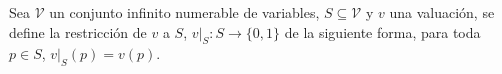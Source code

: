 %
%

\begin{definition}
Sea $\mathcal{V}$ un conjunto infinito numerable de variables, $S \subseteq \mathcal{V}$ y $v$ una valuación, se define la restricción de $v$ a $S$, $v|_S:S \to \{0, 1\}$ de la siguiente forma, para toda $p \in S$, $v|_S (p) = v(p)$.
\end{definition}

